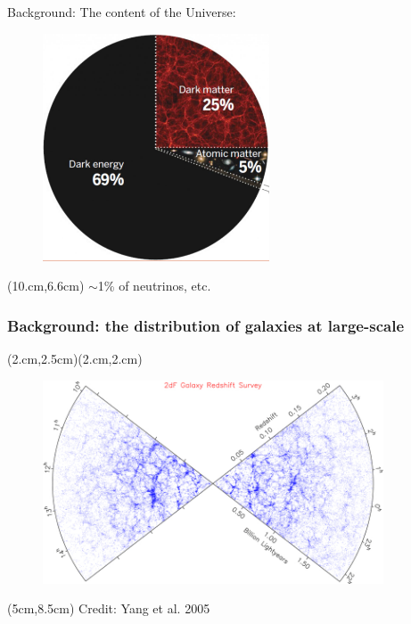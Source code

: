 \documentclass[aspectratio=43]{beamer}
\begin{document}
\begin{frame}{Background:}
The content of the Universe:
\begin{figure}
    \includegraphics[width=0.6\textwidth]{fraction.jpg}
\end{figure}
\begin{textblock*}{4cm}(10.cm,6.6cm)
{$\sim$1\% of neutrinos, etc.}
\end{textblock*}
\end{frame}

\begin{frame}
  \frametitle{Background: the distribution of galaxies at large-scale}
  (2.cm,2.5cm)(2.cm,2.cm)
  \begin{figure}
    \includegraphics[width=0.9\textwidth]{2dFzcone.jpg}
  \end{figure}
  \begin{textblock*}{4cm}(5cm,8.5cm)
    {Credit: Yang et al. 2005}
  \end{textblock*}
\end{frame}
\end{document}

